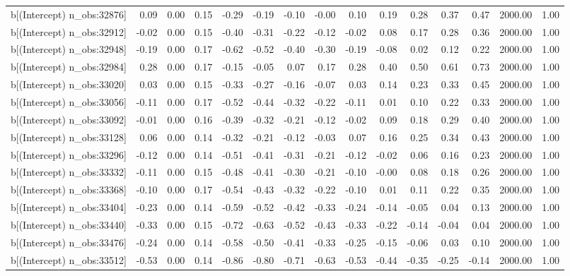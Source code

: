\begin{table}[ht]
\begin{tabular}{rrrrrrrrrrrrrrr}
  b[(Intercept) n\_obs:32876] & 0.09 & 0.00 & 0.15 & -0.29 & -0.19 & -0.10 & -0.00 & 0.10 & 0.19 & 0.28 & 0.37 & 0.47 & 2000.00 & 1.00 \\ 
  b[(Intercept) n\_obs:32912] & -0.02 & 0.00 & 0.15 & -0.40 & -0.31 & -0.22 & -0.12 & -0.02 & 0.08 & 0.17 & 0.28 & 0.36 & 2000.00 & 1.00 \\ 
  b[(Intercept) n\_obs:32948] & -0.19 & 0.00 & 0.17 & -0.62 & -0.52 & -0.40 & -0.30 & -0.19 & -0.08 & 0.02 & 0.12 & 0.22 & 2000.00 & 1.00 \\ 
  b[(Intercept) n\_obs:32984] & 0.28 & 0.00 & 0.17 & -0.15 & -0.05 & 0.07 & 0.17 & 0.28 & 0.40 & 0.50 & 0.61 & 0.73 & 2000.00 & 1.00 \\ 
  b[(Intercept) n\_obs:33020] & 0.03 & 0.00 & 0.15 & -0.33 & -0.27 & -0.16 & -0.07 & 0.03 & 0.14 & 0.23 & 0.33 & 0.45 & 2000.00 & 1.00 \\ 
  b[(Intercept) n\_obs:33056] & -0.11 & 0.00 & 0.17 & -0.52 & -0.44 & -0.32 & -0.22 & -0.11 & 0.01 & 0.10 & 0.22 & 0.33 & 2000.00 & 1.00 \\ 
  b[(Intercept) n\_obs:33092] & -0.01 & 0.00 & 0.16 & -0.39 & -0.32 & -0.21 & -0.12 & -0.02 & 0.09 & 0.18 & 0.29 & 0.40 & 2000.00 & 1.00 \\ 
  b[(Intercept) n\_obs:33128] & 0.06 & 0.00 & 0.14 & -0.32 & -0.21 & -0.12 & -0.03 & 0.07 & 0.16 & 0.25 & 0.34 & 0.43 & 2000.00 & 1.00 \\ 
  b[(Intercept) n\_obs:33296] & -0.12 & 0.00 & 0.14 & -0.51 & -0.41 & -0.31 & -0.21 & -0.12 & -0.02 & 0.06 & 0.16 & 0.23 & 2000.00 & 1.00 \\ 
  b[(Intercept) n\_obs:33332] & -0.11 & 0.00 & 0.15 & -0.48 & -0.41 & -0.30 & -0.21 & -0.10 & -0.00 & 0.08 & 0.18 & 0.26 & 2000.00 & 1.00 \\ 
  b[(Intercept) n\_obs:33368] & -0.10 & 0.00 & 0.17 & -0.54 & -0.43 & -0.32 & -0.22 & -0.10 & 0.01 & 0.11 & 0.22 & 0.35 & 2000.00 & 1.00 \\ 
  b[(Intercept) n\_obs:33404] & -0.23 & 0.00 & 0.14 & -0.59 & -0.52 & -0.42 & -0.33 & -0.24 & -0.14 & -0.05 & 0.04 & 0.13 & 2000.00 & 1.00 \\ 
  b[(Intercept) n\_obs:33440] & -0.33 & 0.00 & 0.15 & -0.72 & -0.63 & -0.52 & -0.43 & -0.33 & -0.22 & -0.14 & -0.04 & 0.04 & 2000.00 & 1.00 \\ 
  b[(Intercept) n\_obs:33476] & -0.24 & 0.00 & 0.14 & -0.58 & -0.50 & -0.41 & -0.33 & -0.25 & -0.15 & -0.06 & 0.03 & 0.10 & 2000.00 & 1.00 \\ 
  b[(Intercept) n\_obs:33512] & -0.53 & 0.00 & 0.14 & -0.86 & -0.80 & -0.71 & -0.63 & -0.53 & -0.44 & -0.35 & -0.25 & -0.14 & 2000.00 & 1.00 \\ 

\end{tabular}
\end{table}
